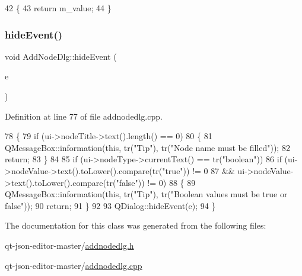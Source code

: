 \begin{DoxyCode}
42 \{
43     \textcolor{keywordflow}{return} m\_value;
44 \}
\end{DoxyCode}
\mbox{\label{class_add_node_dlg_a1f953c07a5711c3064c73d627910e273}} 
\subsubsection{\texorpdfstring{hide\+Event()}{hideEvent()}}
{\footnotesize\ttfamily void Add\+Node\+Dlg\+::hide\+Event (\begin{DoxyParamCaption}\item[{Q\+Hide\+Event $\ast$}]{e }\end{DoxyParamCaption})\hspace{0.3cm}{\ttfamily [protected]}}



Definition at line 77 of file addnodedlg.\+cpp.


\begin{DoxyCode}
78 \{
79     \textcolor{keywordflow}{if} (ui->nodeTitle->text().length() == 0)
80     \{
81         QMessageBox::information(\textcolor{keyword}{this}, tr(\textcolor{stringliteral}{"Tip"}), tr(\textcolor{stringliteral}{"Node name must be filled"}));
82         \textcolor{keywordflow}{return};
83     \}
84 
85     \textcolor{keywordflow}{if} (ui->nodeType->currentText() == tr(\textcolor{stringliteral}{"boolean"}))
86         \textcolor{keywordflow}{if} (ui->nodeValue->text().toLower().compare(tr(\textcolor{stringliteral}{"true"})) != 0
87             && ui->nodeValue->text().toLower().compare(tr(\textcolor{stringliteral}{"false"})) != 0)
88         \{
89             QMessageBox::information(\textcolor{keyword}{this}, tr(\textcolor{stringliteral}{"Tip"}), tr(\textcolor{stringliteral}{"Boolean values must be true or false"}));
90             \textcolor{keywordflow}{return};
91         \}
92 
93     QDialog::hideEvent(e);
94 \}
\end{DoxyCode}


The documentation for this class was generated from the following files\+:\begin{DoxyCompactItemize}
\item 
qt-\/json-\/editor-\/master/\hyperlink{addnodedlg_8h}{addnodedlg.\+h}\item 
qt-\/json-\/editor-\/master/\hyperlink{addnodedlg_8cpp}{addnodedlg.\+cpp}\end{DoxyCompactItemize}

